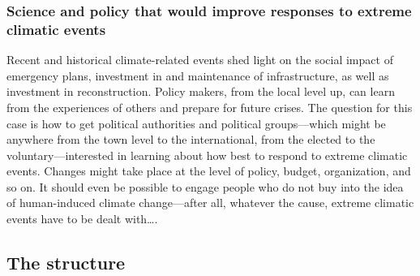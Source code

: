 \subsubsection{Science and policy that would improve responses to
extreme climatic events}

Recent and historical climate-related events shed light on the social
impact of emergency plans, investment in and maintenance of
infrastructure, as well as investment in reconstruction. Policy makers,
from the local level up, can learn from the experiences of others and
prepare for future crises. The question for this case is how to get
political authorities and political groups---which might be anywhere
from the town level to the international, from the elected to the
voluntary---interested in learning about how best to respond to extreme
climatic events. Changes might take place at the level of policy,
budget, organization, and so on. It should even be possible to engage
people who do not buy into the idea of human-induced climate
change---after all, whatever the cause, extreme climatic events have to
be dealt with\ldots{}.

\subsection{The structure}

